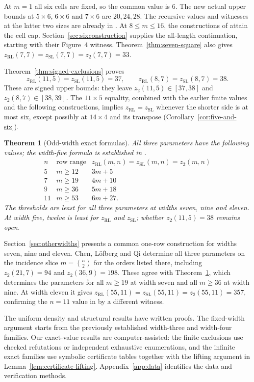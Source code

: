 \documentclass[11pt,a4paper]{article}
\newtheorem{theorem}{Theorem}[section]
\theoremstyle{definition}
\newcommand{\zr}{z_{\mathrm{RL}}}
\newcommand{\zs}{z_{\mathrm{SL}}}
\newcommand{\zt}{z_2}
\begin{document}
At $m=1$ all six cells are fixed, so the common value is $6$.
The new actual upper bounds at $5\times6$, $6\times6$ and $7\times6$
are $20,24,28$. The recursive values and witnesses at the latter two sizes
are already in \cite{CCQ}. At $8\le m\le16$, the constructions of
\cite{CCQ} attain the cell cap. Section~\ref{sec:sixconstruction} supplies
the all-length continuation, starting with their Figure~4 witness.
Theorem~\ref{thm:seven-square} also gives
$\zr(7,7)=\zs(7,7)=\zt(7,7)=33$.

Theorem~\ref{thm:signed-exclusions} proves
\[
 \zr(11,5)=\zs(11,5)=37,\qquad \zr(8,7)=\zs(8,7)=38.
\]
These are signed upper bounds: they leave $\zt(11,5)\in[37,38]$ and
$\zt(8,7)\in[38,39]$. The $11\times5$ equality, combined with the earlier finite values and the
following constructions, implies $\zr=\zs$ whenever the shorter side
is at most six, except possibly at $14\times4$ and its transpose
(Corollary~\ref{cor:five-and-six}).

\begin{theorem}[Odd-width exact formulas]\label{thm:otherwidths}
All three parameters have the following values; the width-five formula
is established in \cite[Theorem~5.4 and Corollary~5.5]{XiChangFive}.
\[
\begin{array}{c|c|c}
 n&\text{row range}&\zr(m,n)=\zs(m,n)=\zt(m,n)\\\hline
 5&m\ge12&3m+5\\
 7&m\ge19&4m+10\\
 9&m\ge36&5m+18\\
 11&m\ge53&6m+27.
\end{array}
\]
The thresholds are least for all three parameters at widths seven, nine
and eleven. At width five, twelve is least for $\zr$ and $\zs$; whether
$\zt(11,5)=38$ remains open.
\end{theorem}
Section~\ref{sec:otherwidths} presents a common one-row construction
for widths seven, nine and eleven.
Chen, L\"ofberg and Qi \cite[Theorem~5.3]{CLQIncidence} determine all
three parameters on the incidence slice $m=\binom n2$ for the orders
listed there, including $\zt(21,7)=94$ and $\zt(36,9)=198$.
These agree with Theorem~\ref{thm:otherwidths}, which determines the
parameters for all $m\ge19$ at width seven and all $m\ge36$ at width nine.
At width eleven it gives $\zr(55,11)=\zs(55,11)=\zt(55,11)=357$,
confirming the $n=11$ value in \cite[Conjecture~4.10]{CLQIncidence}
by a different witness.

The uniform density and structural results have written proofs. The
fixed-width argument starts from the previously established width-three
and width-four families. Our exact-value results are computer-assisted:
the finite exclusions use checked refutations or independent exhaustive
enumerations, and the infinite exact families use symbolic certificate
tables together with the lifting argument in
Lemma~\ref{lem:certificate-lifting}. Appendix~\ref{app:data} identifies
the data and verification methods.
\end{document}
